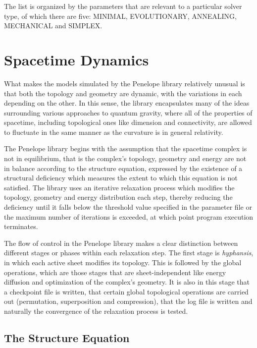 \documentclass[12pt,letterpaper]{report}
\begin{document}
The list is organized by the parameters that are relevant to a particular solver type, 
of which there are five: MINIMAL, EVOLUTIONARY, ANNEALING, MECHANICAL and SIMPLEX.

\chapter{Spacetime Dynamics}

What makes the models simulated by the Penelope library relatively unusual is that 
both the topology and geometry are dynamic, with the variations in each depending on 
the other. In this sense, the library encapsulates many of the ideas surrounding various 
approaches to quantum gravity, where all of the properties of spacetime, including 
topological ones like dimension and connectivity, are allowed to fluctuate in the 
same manner as the curvature is in general relativity. 

The Penelope library begins with the assumption that the spacetime complex is not in 
equilibrium, that is the complex's topology, geometry and energy are not in balance 
according to the structure equation, expressed by the existence of a structural deficiency 
which measures the extent to which this equation is not satisfied. The library uses an 
iterative relaxation process which modifies the topology, geometry and energy distribution 
each step, thereby reducing the deficiency until it falls below the threshold value 
specified in the parameter file or the maximum number of iterations is exceeded, at which 
point program execution terminates. 

The flow of control in the Penelope library makes a clear distinction between different 
stages or phases within each relaxation step. The first stage is \emph{hyphansis}, in which 
each active sheet modifies its topology. This is followed by the global operations, which 
are those stages that are sheet-independent like energy diffusion and optimization of the 
complex's geometry. It is also in this stage that a checkpoint file is written, that 
certain global topological operations are carried out (permutation, superposition and 
compression), that the log file is written and naturally the convergence of the relaxation 
process is tested.   

\section{The Structure Equation}
\end{document}
